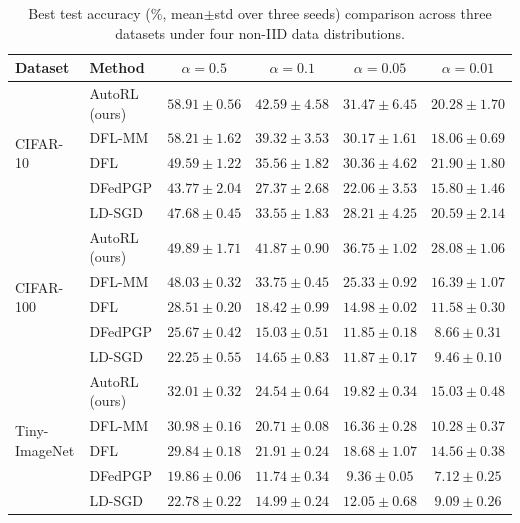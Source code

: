 \begin{table}[t]
\centering
\caption{Best test accuracy (\%, mean$\pm$std over three seeds) comparison across three datasets under four non-IID data distributions.}
\label{tab:test_acc_rtdfl}
\scriptsize
\setlength{\tabcolsep}{2.6pt}
\renewcommand{\arraystretch}{0.95}
\begin{tabular}{@{}llcccc@{}}
\toprule
\textbf{Dataset}
& \textbf{Method}
& $\alpha=0.5$
& $\alpha=0.1$
& $\alpha=0.05$
& $\alpha=0.01$ \\
\midrule
\multirow{5}{*}{CIFAR-10}
& AutoRL (ours) & $58.91\pm0.56$ & $42.59\pm4.58$ & $31.47\pm6.45$ & $20.28\pm1.70$ \\
& DFL-MM        & $58.21\pm1.62$ & $39.32\pm3.53$ & $30.17\pm1.61$ & $18.06\pm0.69$ \\
& DFL           & $49.59\pm1.22$ & $35.56\pm1.82$ & $30.36\pm4.62$ & $21.90\pm1.80$ \\
& DFedPGP       & $43.77\pm2.04$ & $27.37\pm2.68$ & $22.06\pm3.53$ & $15.80\pm1.46$ \\
& LD-SGD        & $47.68\pm0.45$ & $33.55\pm1.83$ & $28.21\pm4.25$ & $20.59\pm2.14$ \\
\midrule
\multirow{5}{*}{CIFAR-100}
& AutoRL (ours) & $49.89\pm1.71$ & $41.87\pm0.90$ & $36.75\pm1.02$ & $28.08\pm1.06$ \\
& DFL-MM        & $48.03\pm0.32$ & $33.75\pm0.45$ & $25.33\pm0.92$ & $16.39\pm1.07$ \\
& DFL           & $28.51\pm0.20$ & $18.42\pm0.99$ & $14.98\pm0.02$ & $11.58\pm0.30$ \\
& DFedPGP       & $25.67\pm0.42$ & $15.03\pm0.51$ & $11.85\pm0.18$ & $8.66\pm0.31$ \\
& LD-SGD        & $22.25\pm0.55$ & $14.65\pm0.83$ & $11.87\pm0.17$ & $9.46\pm0.10$ \\
\midrule
\multirow{5}{*}{Tiny-ImageNet}
& AutoRL (ours) & $32.01\pm0.32$ & $24.54\pm0.64$ & $19.82\pm0.34$ & $15.03\pm0.48$ \\
& DFL-MM        & $30.98\pm0.16$ & $20.71\pm0.08$ & $16.36\pm0.28$ & $10.28\pm0.37$ \\
& DFL           & $29.84\pm0.18$ & $21.91\pm0.24$ & $18.68\pm1.07$ & $14.56\pm0.38$ \\
& DFedPGP       & $19.86\pm0.06$ & $11.74\pm0.34$ & $9.36\pm0.05$ & $7.12\pm0.25$ \\
& LD-SGD        & $22.78\pm0.22$ & $14.99\pm0.24$ & $12.05\pm0.68$ & $9.09\pm0.26$ \\
\bottomrule
\end{tabular}
\end{table}
